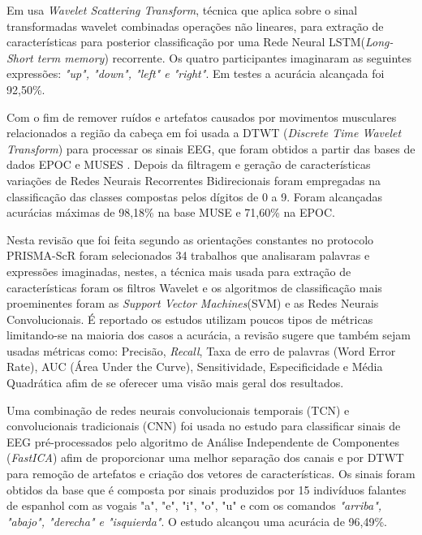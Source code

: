 			\par Em \cite{AbdulghaniMokhlesM2023ISCU} usa \textit{Wavelet Scattering Transform}, técnica que aplica sobre o sinal transformadas wavelet combinadas operações não lineares, para extração de características para posterior classificação por uma Rede Neural LSTM(\textit{Long-Short term memory}) recorrente. Os quatro participantes imaginaram as seguintes expressões: \textit{"up", "down", "left" e "right"}. Em testes a acurácia alcançada foi 92,50\%.
			
			\par Com o fim de remover ruídos e artefatos causados por movimentos musculares relacionados a região da cabeça em \cite{MahapatraNrushinghCharan2023Ecoi} foi usada a DTWT (\textit{Discrete Time Wavelet Transform}) para processar os sinais EEG, que foram obtidos a partir das bases de dados EPOC e MUSES \cite{mindbigdata}. Depois da filtragem e geração de características variações de Redes Neurais Recorrentes Bidirecionais foram empregadas na classificação das classes compostas pelos dígitos de 0 a 9. Foram alcançadas acurácias máximas de 98,18\% na base MUSE e 71,60\% na EPOC.
			
			\par Nesta revisão \cite{ShahUzair2022TRoA} que foi feita segundo as orientações constantes no protocolo PRISMA-ScR foram selecionados 34 trabalhos que analisaram palavras e expressões imaginadas, nestes, a técnica mais usada para extração de características foram os filtros Wavelet e os algoritmos de classificação mais proeminentes foram as \textit{Support Vector Machines}(SVM) e as Redes Neurais Convolucionais. É reportado os estudos utilizam poucos tipos de métricas limitando-se na maioria dos casos a acurácia, a revisão sugere que também sejam usadas métricas como: Precisão, \textit{Recall}, Taxa de erro de palavras (Word Error Rate), AUC (Área Under the Curve), Sensitividade, Especificidade e Média Quadrática afim de se oferecer uma visão mais geral dos resultados. 
			
			\par Uma combinação de redes neurais convolucionais temporais (TCN) e convolucionais tradicionais (CNN) foi usada no estudo \cite{MahapatraNrushinghCharan2022MCoI} para classificar sinais de EEG pré-processados pelo algoritmo de Análise Independente de Componentes (\textit{FastICA}) afim de proporcionar uma melhor separação dos canais e por DTWT para remoção de artefatos e criação dos vetores de características. Os sinais foram obtidos da base \cite{10.1117/12.2255697} que é composta por sinais produzidos por 15 indivíduos falantes de espanhol com as vogais "a", "e", "i", "o", "u" e com os comandos \textit{"arriba", "abajo", "derecha" e "isquierda"}. O estudo alcançou uma acurácia de 96,49\%.


